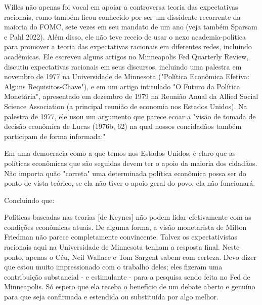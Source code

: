 \documentclass[12pt]{article}
\begin{document}
Willes não apenas foi vocal em apoiar a controversa teoria das expectativas racionais, como também ficou conhecido por ser um dissidente recorrente da maioria do FOMC, sete vezes em seu mandato de um ano (veja também Sparsam e Pahl 2022). Além disso, ele não teve receio de usar o nexo academia-política para promover a teoria das expectativas racionais em diferentes redes, incluindo acadêmicas. Ele escreveu alguns artigos no Minneapolis Fed Quarterly Review, discutiu expectativas racionais em seus discursos, incluindo uma palestra em novembro de 1977 na Universidade de Minnesota ("Política Econômica Efetiva: Alguns Requisitos-Chave"), e em um artigo intitulado "O Futuro da Política Monetária", apresentado em dezembro de 1979 na Reunião Anual da Allied Social Science Association (a principal reunião de economia nos Estados Unidos). Na palestra de 1977, ele usou um argumento que parece ecoar a "visão de tomada de decisão econômica de Lucas (1976b, 62) na qual nossos concidadãos também participam de forma informada:"

Em uma democracia como a que temos nos Estados Unidos, é claro que as políticas econômicas que são seguidas devem ter o apoio da maioria dos cidadãos. Não importa quão "correta" uma determinada política econômica possa ser do ponto de vista teórico, se ela não tiver o apoio geral do povo, ela não funcionará.

Concluindo que:

Políticas baseadas nas teorias [de Keynes] não podem lidar efetivamente com as condições econômicas atuais. De alguma forma, a visão monetarista de Milton Friedman não parece completamente convincente. Talvez os expectativistas racionais aqui na Universidade de Minnesota tenham a resposta final. Neste ponto, apenas o Céu, Neil Wallace e Tom Sargent sabem com certeza. Devo dizer que estou muito impressionado com o trabalho deles; eles fizeram uma contribuição substancial - e estimulante - para a pesquisa sendo feita no Fed de Minneapolis. Só espero que ela receba o benefício de um debate aberto e genuíno para que seja confirmada e estendida ou substituída por algo melhor.
\end{document}
